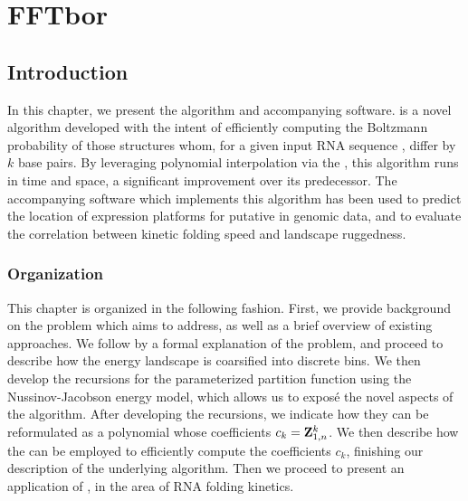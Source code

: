 
\chapter{FFTbor}
\label{ch:fftbor}


\section{Introduction}
\label{sec:fftbor:intro}

In this chapter, we present the \fftbor algorithm and accompanying software.
\fftbor is a novel algorithm developed with the intent of efficiently computing
the Boltzmann probability of those structures whom, for a given input RNA
sequence \seq, differ by $k$ base pairs. By leveraging polynomial interpolation
via the \fft, this algorithm runs in  time and
 space, a significant improvement over its predecessor. The accompanying
software which implements this algorithm has been used to predict the location
of expression platforms for putative \rbs in genomic data, and to
evaluate the correlation between kinetic folding speed and landscape ruggedness.

\subsection{Organization}
\label{subsec:fftbor:org}

This chapter is organized in the following fashion. First, we provide
background on
the problem which \fftbor aims to address, as well as a brief overview of
existing approaches. We follow by a formal explanation of the problem, and
proceed to describe how the energy landscape is coarsified into discrete bins.
We then develop the recursions for the parameterized partition function using
the Nussinov-Jacobson energy model, which allows us to exposé the novel aspects
of the algorithm. After developing the recursions, we indicate how they can be
reformulated as a polynomial whose coefficients $c_k={\bf Z}^{k}_{1,n}$. We then
describe how the \fft can be employed to efficiently compute the coefficients
$c_k$, finishing our description of the underlying algorithm. Then we proceed
to present an application of \fftbor, in the area of RNA folding kinetics.

